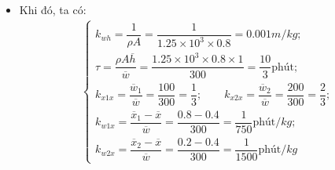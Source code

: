 \begin{itemize}
\begin{itemize}
            \item Khi đó, ta có:
                \begin{align*}
                    \left\{\begin{array}{l}
                        k_{wh} = \dfrac{1}{\rho A} = \dfrac{1}{1.25 \times 10^3 \times 0.8} = 0.001 \unit{m/kg}; \\
                        \tau = \dfrac{\rho A \overline{h}}{\overline{w}} = \dfrac{1.25 \times 10^3 \times 0.8 \times 1}{300} = \dfrac{10}{3} \unit{\textrm{phút}}; \\
                        k_{x1x} = \dfrac{\overline{w}_1}{\overline{w}} = \dfrac{100}{300} = \dfrac{1}{3}; \qquad k_{x2x} = \dfrac{\overline{w}_2}{\overline{w}} = \dfrac{200}{300} = \dfrac{2}{3}; \\
                        k_{w1x} = \dfrac{\overline{x}_1 - \overline{x}}{\overline{w}} = \dfrac{0.8 - 0.4}{300} = \dfrac{1}{750} \unit{\textrm{phút}/kg}; \\
                        k_{w2x} = \dfrac{\overline{x}_2 - \overline{x}}{\overline{w}} = \dfrac{0.2 - 0.4}{300} = \dfrac{1}{1500} \unit{\textrm{phút}/kg}
                    \end{array}\right.
                \end{align*}
        \end{itemize}


\end{itemize}
